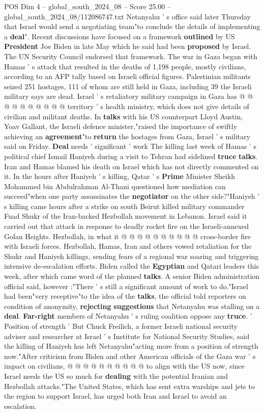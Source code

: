 \begin{textsample}{POS Dim 4 – global\_south\_2024\_08 – Score 25.00 – global\_south\_2024\_08/112086747.txt}
Netanyahu ' s office said later Thursday that Israel would send a negotiating team"to conclude the details of implementing a \textbf{deal}".
Recent discussions have focused on a framework \textbf{outlined} by US \textbf{President} Joe Biden in late May which he said had been \textbf{proposed} by Israel.
The UN Security Council endorsed that framework.
The war in Gaza began with Hamas ' s attack that resulted in the deaths of 1,198 people, mostly civilians, according to an AFP tally based on Israeli official figures.
Palestinian militants seized 251 hostages, 111 of whom are still held in Gaza, including 39 the Israeli military says are dead.
Israel ' s retaliatory military campaign in Gaza has @ @ @ @ @ @ @ @ @ @ territory ' s health ministry, which does not give details of civilian and militant deaths.
In \textbf{talks} with his US counterpart Lloyd Austin, Yoav Gallant, the Israeli defence minister,"raised the importance of swiftly achieving an \textbf{agreement}"to \textbf{return} the hostages from Gaza, Israel ' s military said on Friday. \textbf{Deal} needs ' significant ' work The killing last week of Hamas ' s political chief Ismail Haniyeh during a visit to Tehran had sidelined \textbf{truce} \textbf{talks}.
Iran and Hamas blamed his death on Israel which has not directly commented on it.
In the hours after Haniyeh ' s killing, Qatar ' s \textbf{Prime} Minister Sheikh Mohammed bin Abdulrahman Al-Thani questioned how mediation can succeed"when one party assassinates the \textbf{negotiator} on the other side?"Haniyeh ' s killing came hours after a strike on south Beirut killed military commander Fuad Shukr of the Iran-backed Hezbollah movement in Lebanon.
Israel said it carried out that attack in response to deadly rocket fire on the Israeli-annexed Golan Heights.
Hezbollah, in what it @ @ @ @ @ @ @ @ @ @ cross-border fire with Israeli forces.
Hezbollah, Hamas, Iran and others vowed retaliation for the Shukr and Haniyeh killings, sending fears of a regional war soaring and triggering intensive de-escalation efforts.
Biden called the \textbf{Egyptian} and Qatari leaders this week, after which came word of the planned \textbf{talks}.
A senior Biden administration official said, however :"There ' s still a significant amount of work to do."Israel had been"very receptive"to the idea of the \textbf{talks}, the official told reporters on condition of anonymity, \textbf{rejecting} \textbf{suggestions} that Netanyahu was stalling on a \textbf{deal}. \textbf{Far-right} members of Netanyahu ' s ruling coalition oppose any \textbf{truce}. ' Position of strength ' But Chuck Freilich, a former Israeli national security adviser and researcher at Israel ' s Institute for National Security Studies, said the killing of Haniyeh has left Netanyahu"acting more from a position of strength now."After criticism from Biden and other American officials of the Gaza war ' s impact on civilians, @ @ @ @ @ @ @ @ @ @ to align with the US now, since Israel needs the US so much for \textbf{dealing} with the potential Iranian and Hezbollah attacks."The United States, which has sent extra warships and jets to the region to support Israel, has urged both Iran and Israel to avoid an escalation.

\end{textsample}
